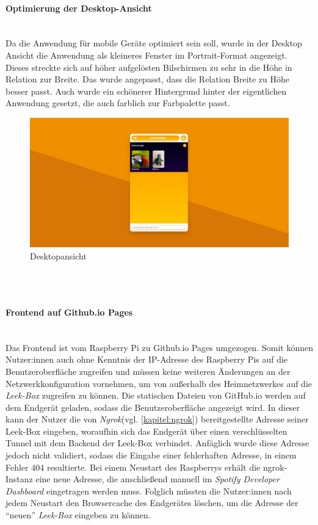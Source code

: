 \documentclass[10pt, a4paper]{article}
\begin{document}
\begin{onehalfspace}
\paragraph*{Optimierung der Desktop-Ansicht} $~$ \\
Da die Anwendung für mobile Geräte optimiert sein soll, wurde in der Desktop Ansicht die Anwendung als kleineres Fenster im Portrait-Format angezeigt.
Dieses streckte sich auf höher aufgelösten Bilschirmen zu sehr in die Höhe in Relation zur Breite.
Das wurde angepasst, dass die Relation Breite zu Höhe besser passt.
Auch wurde ein schönerer Hintergrund hinter der eigentlichen Anwendung gesetzt, die auch farblich zur Farbpalette passt.
\begin{figure}[ht]
  \includegraphics[width=\textwidth]{HomescreenDesktop.jpeg}
    \caption{Desktopansicht}
\end{figure}
\\~\\
\paragraph*{Frontend auf Github.io Pages} $~$ \\
Das Frontend ist vom Raspberry Pi zu Github.io Pages umgezogen.
Somit können Nutzer:innen auch ohne Kenntnis der IP-Adresse des Raspberry Pis auf die Benutzeroberfläche zugreifen
und müssen keine weiteren Änderungen an der Netzwerkkonfiguration vornehmen, um von außerhalb des Heimnetzwerkes auf die \textit{Leek-Box} zugreifen zu können.
Die statischen Dateien von GitHub.io werden auf dem Endgerät geladen, sodass die Benutzeroberfläche angezeigt wird.
In dieser kann der Nutzer die von \textit{Ngrok}(vgl. \autoref{kapitel:ngrok}) bereitgestellte Adresse seiner Leek-Box eingeben, woraufhin sich das Endgerät über einen verschlüsselten Tunnel mit dem Backend der Leek-Box verbindet.
Anfäglich wurde diese Adresse jedoch nicht validiert, sodass die Eingabe einer fehlerhaften Adresse, in einem Fehler 404 resultierte.
Bei einem Neustart des Raspberrys erhält die ngrok-Instanz eine neue Adresse, die anschließend manuell im \textit{Spotify Developer Dashboard} eingetragen werden muss.
Folglich müssten die Nutzer:innen nach jedem Neustart den Browsercache des Endgerätes löschen, um die Adresse der \enquote{neuen} \textit{Leek-Box} eingeben zu können.
\\~\\


\end{onehalfspace}
\end{document}
